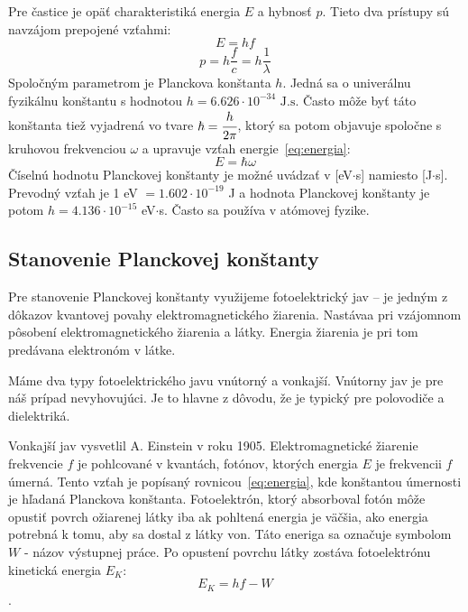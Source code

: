 \documentclass[12pt,a4paper,final]{report}
\begin{document}
Pre častice je opäť charakteristiká energia $E$ a hybnosť $p$. Tieto dva prístupy sú navzájom prepojené vzťahmi:
\begin{equation} \label{eq:energia}
	E=hf
\end{equation}
\begin{equation} \label{eq:hybnost}
	p=h\frac{f}{c}=h\frac{1}{\lambda}
\end{equation}Spoločným parametrom je Planckova konštanta $h$. Jedná sa o univerálnu fyzikálnu konštantu s hodnotou $h=6.626\cdot10^{-34}\text{ J.s}$. Často môže byť táto konštanta tiež vyjadrená vo tvare $\hbar=\cfrac{h}{2\pi}$, ktorý sa potom objavuje spoločne s kruhovou frekvenciou $\omega$ a upravuje vzťah energie~\eqref{eq:energia}:
\begin{equation} \label{eq:energia2}
	E=\hbar\omega
\end{equation}
Číselnú hodnotu Planckovej konštanty je možné uvádzať v [eV$\cdot$s] namiesto [J$\cdot$s]. Prevodný vzťah je 1 eV $= 1.602\cdot10^{-19}$ J a hodnota Planckovej konštanty je potom $h=4.136\cdot 10^{-15}$ eV$\cdot$s. Často sa používa v atómovej fyzike.

\subsection*{Stanovenie Planckovej konštanty}
Pre stanovenie Planckovej konštanty využijeme fotoelektrický jav -- je jedným z dôkazov kvantovej povahy elektromagnetického žiarenia. Nastávaa pri vzájomnom pôsobení elektromagnetického žiarenia a látky. Energia žiarenia je pri tom predávana elektronóm v látke.

Máme dva typy fotoelektrického javu vnútorný a vonkajší. Vnútorny jav je pre náš prípad nevyhovujúci. Je to hlavne z dôvodu, že je typický pre polovodiče a dielektriká.

Vonkajší jav vysvetlil A. Einstein v roku 1905. Elektromagnetické žiarenie frekvencie $f$ je pohlcované v kvantách, fotónov, ktorých energia $E$ je frekvencii $f$ úmerná. Tento vzťah je popísaný rovnicou~\eqref{eq:energia}, kde konštantou úmernosti je hľadaná Planckova konštanta. Fotoelektrón, ktorý absorboval fotón môže opustiť povrch ožiarenej látky iba ak pohltená energia je väčšia, ako energia potrebná k tomu, aby sa dostal z látky von. Táto eneriga sa označuje symbolom $W$ - názov výstupnej práce. Po opustení povrchu látky zostáva fotoelektrónu kinetická energia $E_K$:
\begin{equation} \label{eq:kinetickaEnergia}
	E_K=hf-W
\end{equation}.
\end{document}
